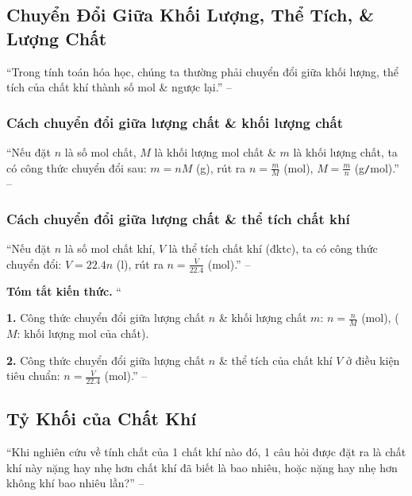 \documentclass{article}
\numberwithin{equation}{section}
\begin{document}

\subsection{Chuyển Đổi Giữa Khối Lượng, Thể Tích, \& Lượng Chất}
``Trong tính toán hóa học, chúng ta thường phải chuyển đổi giữa khối lượng, thể tích của chất khí thành số mol \& ngược lại.'' -- \cite[p. 66]{SGK_Hoa_Hoc_8}

\subsubsection{Cách chuyển đổi giữa lượng chất \& khối lượng chất}
``Nếu đặt $n$ là số mol chất, $M$ là khối lượng mol chất \& $m$ là khối lượng chất, ta có công thức chuyển đổi sau: $m = nM$ (g), rút ra $n = \frac{m}{M}$ (mol), $M = \frac{m}{n}$ (g\texttt{/}mol).'' -- \cite[p. 66]{SGK_Hoa_Hoc_8}

\subsubsection{Cách chuyển đổi giữa lượng chất \& thể tích chất khí}
``Nếu đặt $n$ là số mol chất khí, $V$ là thể tích chất khí (đktc), ta có công thức chuyển đổi: $V = 22.4n$ (l), rút ra $n = \frac{V}{22.4}$ (mol).'' -- \cite[p. 66]{SGK_Hoa_Hoc_8}
\vspace{2mm}

\noindent\textbf{Tóm tắt kiến thức.}
``\begin{enumerate*}
	\item[\textbf{1.}] Công thức chuyển đổi giữa lượng chất $n$ \& khối lượng chất $m$: $n = \frac{n}{M}$ (mol), ($M$: khối lượng mol của chất).
	\item[\textbf{2.}] Công thức chuyển đổi giữa lượng chất $n$ \& thể tích của chất khí $V$ ở điều kiện tiêu chuẩn: $n = \frac{V}{22.4}$ (mol).'' -- \cite[p. 67]{SGK_Hoa_Hoc_8}
\end{enumerate*}


\subsection{Tỷ Khối của Chất Khí}
``Khi nghiên cứu về tính chất của 1 chất khí nào đó, 1 câu hỏi được đặt ra là chất khí này nặng hay nhẹ hơn chất khí đã biết là bao nhiêu, hoặc nặng hay nhẹ hơn không khí bao nhiêu lần?'' -- \cite[p. 68]{SGK_Hoa_Hoc_8}
\end{document}
